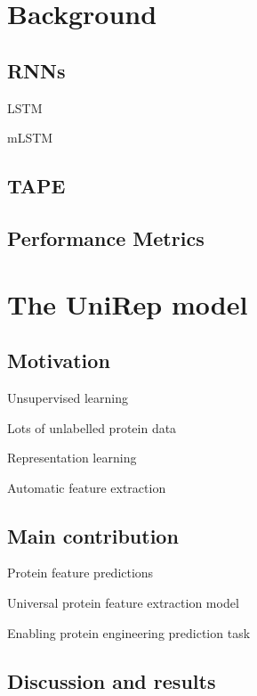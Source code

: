\documentclass[a4paper,11pt]{article}
\begin{document}

\clearpage
\section{Background}


\subsection{RNNs}
    LSTM
    
    mLSTM

\subsection{TAPE}
\subsection{Performance Metrics}

\clearpage
\section{The UniRep model}

\subsection{Motivation}

Unsupervised learning

Lots of unlabelled protein data

Representation learning

Automatic feature extraction

\subsection{Main contribution}

Protein feature predictions

Universal protein feature extraction model

Enabling protein engineering prediction task

\subsection{Discussion and results}
\end{document}

